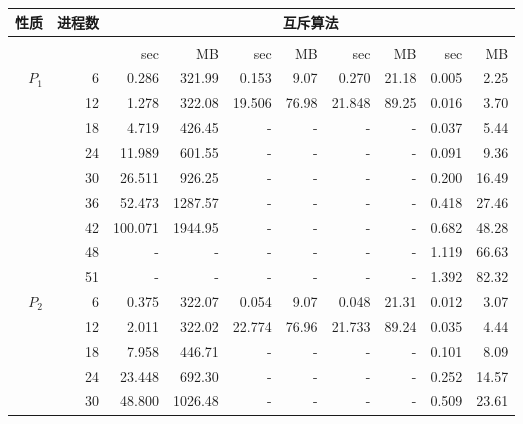 \begin{figure}[h!]\scriptsize
	\centering
	\setlength{\tabcolsep}{8pt}
	\renewcommand\arraystretch{0.8}
	\begin{tabular}{| r | r | r | r | r | r | r | r | r | r |}
		\hline
		\textbf{性质} & \textbf{进程数} & \multicolumn{8}{c|}{互斥算法} \\
		\hline
		{} & {} & \multicolumn{2}{c|}{\verds{}} & \multicolumn{2}{c|}{\nusmv{}} & \multicolumn{2}{c|}{\nuxmv{}} &  \multicolumn{2}{c|}{\sctl{}} \\
		\hline
		{} & {} & sec & MB & sec & MB & sec & MB &  sec & MB \\
		\hline
		\multirow{6}{*}{$P_1$} & 6 & 0.286 & 321.99 & 0.153 & 9.07 & 0.270 & 21.18 & 0.005 & 2.25 \\
		{} & 12 & 1.278 & 322.08 & 19.506 & 76.98 & 21.848 & 89.25 & 0.016 & 3.70  \\
		{} & 18 & 4.719 & 426.45 & - & - & - & - & 0.037 & 5.44  \\
		{} & 24 & 11.989 & 601.55 & - & - & - & - & 0.091 & 9.36  \\
		{} & 30 & 26.511 & 926.25 & - & - & - & - & 0.200 & 16.49  \\
		{} & 36 & 52.473 & 1287.57 & - & - & - & - & 0.418 & 27.46  \\
		{} & 42 & 100.071 & 1944.95 & - & - & - & - & 0.682 & 48.28  \\
		{} & 48 & - & - & - & - & - & - & 1.119 & 66.63  \\
		{} & 51 & - & - & - & - & - & - & 1.392 & 82.32  \\
		\hline
		\multirow{6}{*}{$P_2$} & 6 & 0.375 & 322.07 & 0.054 & 9.07 & 0.048 & 21.31 & 0.012 & 3.07  \\
		{} & 12 & 2.011 & 322.02 & 22.774 & 76.96 & 21.733 & 89.24 & 0.035 & 4.44  \\
		{} & 18 & 7.958 & 446.71 & - & - & - & - & 0.101 & 8.09  \\
		{} & 24 & 23.448 & 692.30 & - & - & - & - & 0.252 & 14.57  \\
		{} & 30 & 48.800 & 1026.48 & - & - & - & - & 0.509 & 23.61  \\

\end{tabular}
\end{figure}
